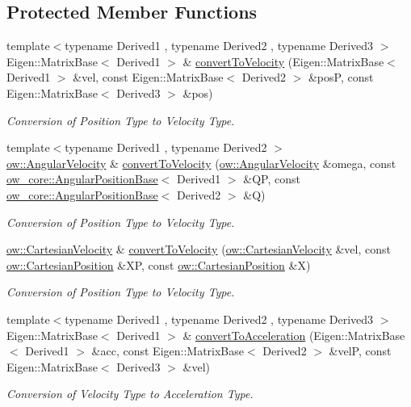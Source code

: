 \subsection*{Protected Member Functions}
\begin{DoxyCompactItemize}
\item 
{\footnotesize template$<$typename Derived1 , typename Derived2 , typename Derived3 $>$ }\\Eigen\+::\+Matrix\+Base$<$ Derived1 $>$ \& \hyperlink{classow__core_1_1StateDifferentiator_ab213889533c6acaeb0200ae6888a1e17}{convert\+To\+Velocity} (Eigen\+::\+Matrix\+Base$<$ Derived1 $>$ \&vel, const Eigen\+::\+Matrix\+Base$<$ Derived2 $>$ \&posP, const Eigen\+::\+Matrix\+Base$<$ Derived3 $>$ \&pos)
\begin{DoxyCompactList}\small\item\em Conversion of Position Type to Velocity Type. \end{DoxyCompactList}\item 
{\footnotesize template$<$typename Derived1 , typename Derived2 $>$ }\\\hyperlink{classow__core_1_1AngularVelocity}{ow\+::\+Angular\+Velocity} \& \hyperlink{classow__core_1_1StateDifferentiator_aabad1cb2f6df64e2694490c791f93bd7}{convert\+To\+Velocity} (\hyperlink{classow__core_1_1AngularVelocity}{ow\+::\+Angular\+Velocity} \&omega, const \hyperlink{classow__core_1_1AngularPositionBase}{ow\+\_\+core\+::\+Angular\+Position\+Base}$<$ Derived1 $>$ \&QP, const \hyperlink{classow__core_1_1AngularPositionBase}{ow\+\_\+core\+::\+Angular\+Position\+Base}$<$ Derived2 $>$ \&Q)
\begin{DoxyCompactList}\small\item\em Conversion of Position Type to Velocity Type. \end{DoxyCompactList}\item 
\hyperlink{classow__core_1_1CartesianVelocity}{ow\+::\+Cartesian\+Velocity} \& \hyperlink{classow__core_1_1StateDifferentiator_a4151b65061e3e31528d8283e417174bb}{convert\+To\+Velocity} (\hyperlink{classow__core_1_1CartesianVelocity}{ow\+::\+Cartesian\+Velocity} \&vel, const \hyperlink{classow__core_1_1CartesianPosition}{ow\+::\+Cartesian\+Position} \&XP, const \hyperlink{classow__core_1_1CartesianPosition}{ow\+::\+Cartesian\+Position} \&X)
\begin{DoxyCompactList}\small\item\em Conversion of Position Type to Velocity Type. \end{DoxyCompactList}\item 
{\footnotesize template$<$typename Derived1 , typename Derived2 , typename Derived3 $>$ }\\Eigen\+::\+Matrix\+Base$<$ Derived1 $>$ \& \hyperlink{classow__core_1_1StateDifferentiator_a6fd4f559a8ca0cd4317059d79c5d2046}{convert\+To\+Acceleration} (Eigen\+::\+Matrix\+Base$<$ Derived1 $>$ \&acc, const Eigen\+::\+Matrix\+Base$<$ Derived2 $>$ \&velP, const Eigen\+::\+Matrix\+Base$<$ Derived3 $>$ \&vel)
\begin{DoxyCompactList}\small\item\em Conversion of Velocity Type to Acceleration Type. \end{DoxyCompactList}\end{DoxyCompactItemize}

